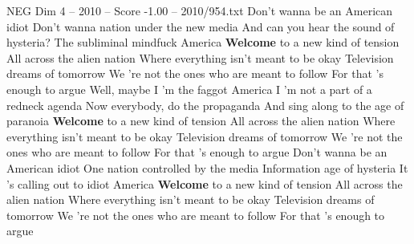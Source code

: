 \begin{textsample}{NEG Dim 4 – 2010 – Score -1.00 – 2010/954.txt}  \label{ex:f4_neg_003}
Don't wanna be an American idiot Don't wanna nation under the new media And can you hear the sound of hysteria?
The subliminal mindfuck America \textbf{Welcome} to a new kind of tension All across the alien nation Where everything isn't meant to be okay Television dreams of tomorrow We 're not the ones who are meant to follow For that 's enough to argue Well, maybe I 'm the faggot America I 'm not a part of a redneck agenda Now everybody, do the propaganda And sing along to the age of paranoia \textbf{Welcome} to a new kind of tension All across the alien nation Where everything isn't meant to be okay Television dreams of tomorrow We 're not the ones who are meant to follow For that 's enough to argue Don't wanna be an American idiot One nation controlled by the media Information age of hysteria It 's calling out to idiot America \textbf{Welcome} to a new kind of tension All across the alien nation Where everything isn't meant to be okay Television dreams of tomorrow We 're not the ones who are meant to follow For that 's enough to argue

\end{textsample}
